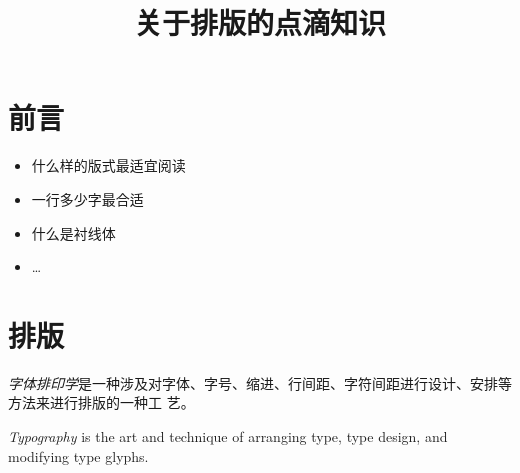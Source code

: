 ﻿\documentclass[hyperref={bookmarks=true},xcolor=pdflatex,svgnames,table,compress]{beamer}
\title{关于排版的点滴知识}
\author{}
\date{}
\begin{document}
\begin{frame}
  \titlepage
\end{frame}

\section{前言}

\begin{frame}
  \begin{itemize}
  \item 什么样的版式最适宜阅读
  \item 一行多少字最合适
  \item 什么是衬线体
  \item \ldots
  \end{itemize}
\end{frame}

\section{排版}
\begin{frame}

  \begin{block}

    {\em 字体排印学}是一种涉及对字体、字号、缩进、行间距、字符间距进行设计、安排等方法来进行排版的一种工
    艺。
  \end{block}

  \begin{block}

    {\em Typography} is the art and technique of arranging type, type design, and modifying type
    glyphs.
  \end{block}

\end{frame}
\end{document}
